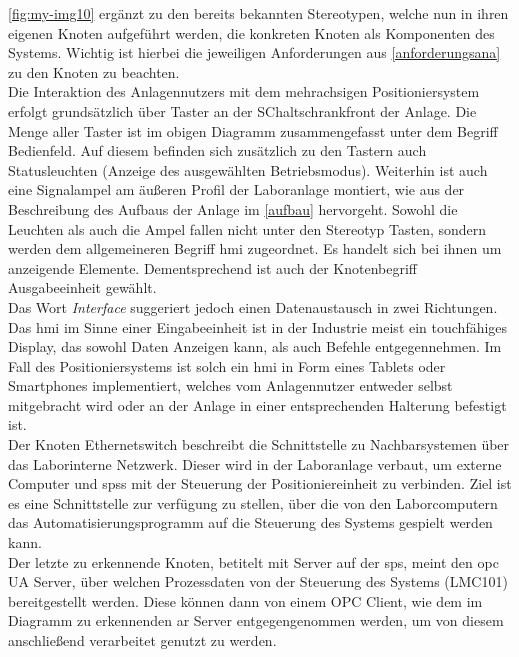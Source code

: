 \documentclass[../../../Bachelorarbeit.tex]{subfiles}
\begin{document}
\autoref{fig:my-img10} ergänzt zu den bereits bekannten Stereotypen, welche nun in ihren eigenen Knoten aufgeführt werden, die konkreten Knoten als Komponenten des Systems. Wichtig ist hierbei die jeweiligen Anforderungen aus \autoref{anforderungsana} zu den Knoten zu beachten.\\
Die Interaktion des Anlagennutzers mit dem mehrachsigen Positioniersystem erfolgt grundsätzlich über Taster an der SChaltschrankfront der Anlage. Die Menge aller Taster ist im obigen Diagramm zusammengefasst unter dem Begriff Bedienfeld. Auf diesem befinden sich zusätzlich zu den Tastern auch Statusleuchten (Anzeige des ausgewählten Betriebsmodus). Weiterhin ist auch eine Signalampel am äußeren Profil der Laboranlage montiert, wie aus der Beschreibung des Aufbaus der Anlage im \autoref{aufbau} hervorgeht. Sowohl die Leuchten als auch die Ampel fallen nicht unter den Stereotyp Tasten, sondern werden dem allgemeineren Begriff \acf{hmi} zugeordnet. Es handelt sich bei ihnen um anzeigende Elemente. Dementsprechend ist auch der Knotenbegriff Ausgabeeinheit gewählt. \\
Das Wort \textit{Interface} suggeriert jedoch einen Datenaustausch in zwei Richtungen. Das \ac{hmi} im Sinne einer Eingabeeinheit ist in der Industrie meist ein touchfähiges Display, das sowohl Daten Anzeigen kann, als auch Befehle entgegennehmen. Im Fall des Positioniersystems ist solch ein \ac{hmi} in Form eines Tablets oder Smartphones implementiert, welches vom Anlagennutzer entweder selbst mitgebracht wird oder an der Anlage in einer entsprechenden Halterung befestigt ist.\\
Der Knoten Ethernetswitch beschreibt die Schnittstelle zu Nachbarsystemen über das Laborinterne Netzwerk. Dieser wird in der Laboranlage verbaut, um externe Computer und \acsp{sps} mit der Steuerung der Positioniereinheit zu verbinden. Ziel ist es eine Schnittstelle zur verfügung zu stellen, über die von den Laborcomputern das Automatisierungsprogramm auf die Steuerung des Systems gespielt werden kann. \\
Der letzte zu erkennende Knoten, betitelt mit Server auf der \ac{sps}, meint den \ac{opc} UA Server, über welchen Prozessdaten von der Steuerung des Systems (LMC101) bereitgestellt werden. Diese können dann von einem OPC Client, wie \zB dem im Diagramm zu erkennenden \ac{ar} Server entgegengenommen werden, um von diesem anschließend verarbeitet \bzw genutzt zu werden.
\end{document}
